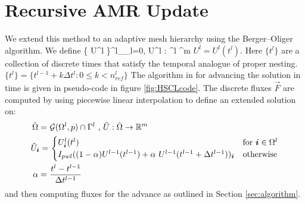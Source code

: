 \section{Recursive AMR Update}

We extend this method to an adaptive mesh hierarchy using the
Berger--Oliger algorithm.  We define
\beqa
\{ U^l \}^{l_{\max}}_{l=0}, U^l : \Omega^l ^m
\eeqa
$U^l = U^l(t^l)$.  Here $\{ t^l \}$ are a collection of discrete times
that satisfy the temporal analogue of proper nesting.  $ \{ t^l \} =
\{ t^{l-1} + k \Delta t^l : 0 \leq k < n^l_{ref} \}$  The
algorithm in \cite{bergerColella:1989} 
for advancing the solution in time is given in
pseudo-code in figure \ref{fig:HSCLcode}.
The discrete fluxes $\vec{F}$ are computed
by using piecewise linear interpolation to define an extended solution
on:
\begin{align*}
\tilde{\Omega} = \,\, & {\mathcal{G}}(\Omega^l, p) \cap \Gamma^l 
\mbox{ , } \tilde{U} : \tilde{\Omega} \rightarrow {\mathbb{R}}^m \\
\tilde{U}_{{\boldsymbol{i}}} = \, &
  \begin{cases}
    U^l_{\boldsymbol{i}} (t^l) &
      \text{for ${\boldsymbol{i}} \in \Omega^l$}
    \\ 
    I_{pwl} ((1 - \alpha)  U^{l-1}(t^{l-1}                 ) +
                  \alpha ~ U^{l-1}(t^{l-1} + \Delta t^{l-1}))_{\boldsymbol{i}} &
      \text{otherwise}
  \end{cases} \\
\alpha = \,\, & \frac{t^l - t^{l-1}}{\Delta t^{l-1}}
\end{align*}
and then computing fluxes for the advance as outlined in Section
\ref{sec:algorithm}. 


